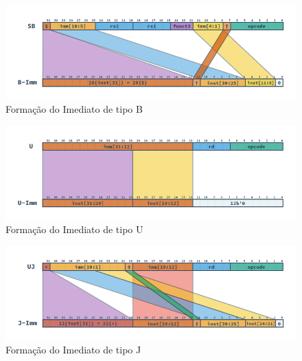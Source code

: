     \begin{figure}[H]
    \centering
        \includegraphics[width=.9\linewidth]{../images/RV_B_Imm.png}
        \caption{Formação do Imediato de tipo B}\label{fig:riscv_b_imm}
    \end{figure}

    \begin{figure}[H]
    \centering
        \includegraphics[width=.9\linewidth]{../images/RV_U_Imm.png}
        \caption{Formação do Imediato de tipo U}\label{fig:riscv_u_imm}
    \end{figure}

    \begin{figure}[H]
    \centering
        \includegraphics[width=.9\linewidth]{../images/RV_J_Imm.png}
        \caption{Formação do Imediato de tipo J}\label{fig:riscv_j_imm}
    \end{figure}


